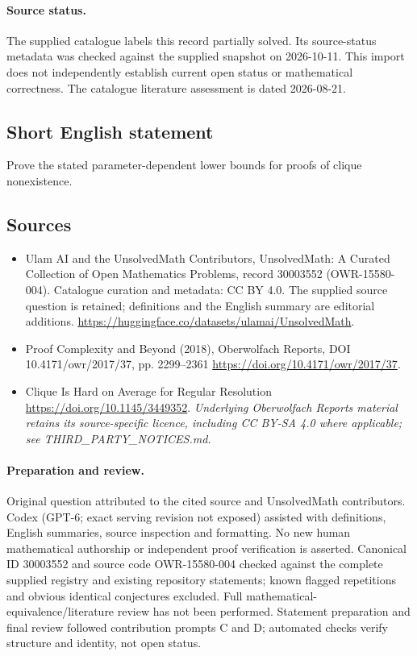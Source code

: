 \documentclass[11pt]{article}
\begin{document}
\paragraph{Source status.}
The supplied catalogue labels this record partially solved. Its source-status metadata was checked against the supplied snapshot on 2026-10-11. This import does not independently establish current open status or mathematical correctness. The catalogue literature assessment is dated 2026-08-21.
\subsection{Short English statement}
Prove the stated parameter-dependent lower bounds for proofs of clique nonexistence.
\subsection{Sources}
\begin{itemize}
\item[S1] Ulam AI and the UnsolvedMath Contributors, UnsolvedMath: A Curated Collection of Open Mathematics Problems, record 30003552 (OWR-15580-004). Catalogue curation and metadata: CC BY 4.0. The supplied source question is retained; definitions and the English summary are editorial additions.
\url{https://huggingface.co/datasets/ulamai/UnsolvedMath}.
\item[S2] Proof Complexity and Beyond (2018), Oberwolfach Reports, DOI 10.4171/owr/2017/37, pp. 2299--2361
\url{https://doi.org/10.4171/owr/2017/37}.
\item[S3] Clique Is Hard on Average for Regular Resolution
\url{https://doi.org/10.1145/3449352}.
\textit{Underlying Oberwolfach Reports material retains its source-specific licence, including CC BY-SA 4.0 where applicable; see THIRD\_PARTY\_NOTICES.md.}
\end{itemize}
\paragraph{Preparation and review.}
Original question attributed to the cited source and UnsolvedMath contributors. Codex (GPT-6; exact serving revision not exposed) assisted with definitions, English summaries, source inspection and formatting. No new human mathematical authorship or independent proof verification is asserted. Canonical ID 30003552 and source code OWR-15580-004 checked against the complete supplied registry and existing repository statements; known flagged repetitions and obvious identical conjectures excluded. Full mathematical-equivalence/literature review has not been performed. Statement preparation and final review followed contribution prompts C and D; automated checks verify structure and identity, not open status.
\label{end:30003552}
\end{document}
